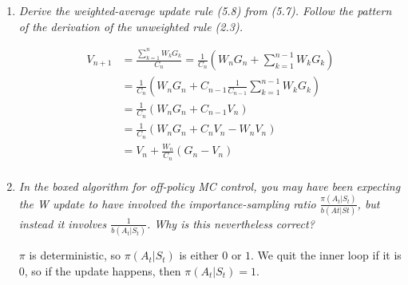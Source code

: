 \documentclass[12pt,a4paper]{article}
\begin{document}
\begin{enumerate}
  \newpage
  \item
    \textit{Derive the weighted-average update rule (5.8) from (5.7). Follow the
    pattern of the derivation of the unweighted rule (2.3).}

    \begin{align*}
      V_{n + 1} &= \frac{\sum\limits_{k = 1}^n W_k G_k}{C_n}
      = \frac{1}{C_n} \left( W_n G_n + \sum\limits_{k = 1}^{n - 1} W_k G_k\right)\\
      &= \frac{1}{C_n} \left( W_n G_n + C_{n - 1} \frac{1}{C_{n - 1}} \sum\limits_{k = 1}^{n - 1} W_k G_k \right)\\
      &= \frac{1}{C_n} \left( W_n G_n + C_{n - 1} V_n \right)\\
      &= \frac{1}{C_n} \left( W_n G_n + C_n V_n  - W_n V_n\right)\\
      &= V_n + \frac{W_n}{C_n} (G_n - V_n)\\
    \end{align*}

  \item
    \textit{In the boxed algorithm for off-policy MC control, you may have been
    expecting the W update to have involved the importance-sampling ratio
    $\frac{\pi(A_t|S_t)}{b(At|St)}$, but instead it involves $\frac{1}{b(A_t|S_t)}$.
    Why is this nevertheless correct?}

    $\pi$ is deterministic, so $\pi(A_t |S_t)$ is either $0$ or $1$. We quit the inner loop
    if it is $0$, so if the update happens, then $\pi(A_t |S_t) = 1$.
\end{enumerate}
\end{document}
